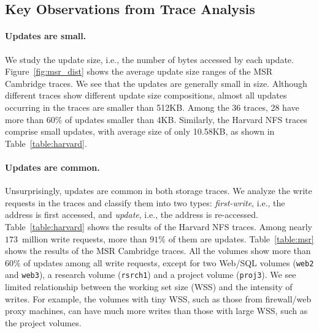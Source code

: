 \subsection{Key Observations from Trace Analysis}


\paragraph{Updates are small.}  We study the update size, i.e., the number of
bytes accessed by each update.  Figure~\ref{fig:msr_dist} shows the average
update size ranges of the MSR Cambridge traces.  We see that the updates are
generally small in size. Although different traces show different
update size compositions, almost all updates occurring in the traces are smaller than
512KB. Among the 36 traces, 28 have more than $60\%$ of updates
smaller than 4KB. Similarly, the Harvard NFS traces comprise small updates,
with average size of only 10.58KB, as shown in Table~\ref{table:harvard}.

\paragraph{Updates are common.} Unsurprisingly, updates are common in both
storage traces.  We analyze the write requests in the traces and classify them
into two types: {\em first-write}, i.e., the address is first accessed, and
{\em update}, i.e., the address is re-accessed.  Table~\ref{table:harvard}
shows the results of the Harvard NFS traces.  Among nearly $173$~million
write requests, more than $91\%$ of them are updates.  Table~\ref{table:msr}
shows the results of the MSR Cambridge traces. All the volumes show more than
$60\%$ of updates among all write requests, except for two Web/SQL volumes
(\texttt{web2} and \texttt{web3}), a research volume (\texttt{rsrch1}) and a
project volume (\texttt{proj3}). We see limited relationship between 
the working set size (WSS) and the intensity of writes.  For example, the
volumes with tiny WSS, such as those from firewall/web proxy machines, can
have much more writes than those with large WSS, such as the project volumes.  


